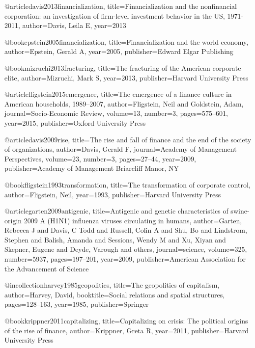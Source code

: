 @article{davis2013financialization,
  title={Financialization and the nonfinancial corporation: an investigation of firm-level investment behavior in the US, 1971-2011},
  author={Davis, Leila E},
  year={2013}
}

@book{epstein2005financialization,
  title={Financialization and the world economy},
  author={Epstein, Gerald A},
  year={2005},
  publisher={Edward Elgar Publishing}
}

@book{mizruchi2013fracturing,
  title={The fracturing of the American corporate elite},
  author={Mizruchi, Mark S},
  year={2013},
  publisher={Harvard University Press}
}

@article{fligstein2015emergence,
  title={The emergence of a finance culture in American households, 1989--2007},
  author={Fligstein, Neil and Goldstein, Adam},
  journal={Socio-Economic Review},
  volume={13},
  number={3},
  pages={575--601},
  year={2015},
  publisher={Oxford University Press}
}

@article{davis2009rise,
  title={The rise and fall of finance and the end of the society of organizations},
  author={Davis, Gerald F},
  journal={Academy of Management Perspectives},
  volume={23},
  number={3},
  pages={27--44},
  year={2009},
  publisher={Academy of Management Briarcliff Manor, NY}
}

@book{fligstein1993transformation,
  title={The transformation of corporate control},
  author={Fligstein, Neil},
  year={1993},
  publisher={Harvard University Press}
}

@article{garten2009antigenic,
  title={Antigenic and genetic characteristics of swine-origin 2009 A (H1N1) influenza viruses circulating in humans},
  author={Garten, Rebecca J and Davis, C Todd and Russell, Colin A and Shu, Bo and Lindstrom, Stephen and Balish, Amanda and Sessions, Wendy M and Xu, Xiyan and Skepner, Eugene and Deyde, Varough and others},
  journal={science},
  volume={325},
  number={5937},
  pages={197--201},
  year={2009},
  publisher={American Association for the Advancement of Science}
}

@incollection{harvey1985geopolitics,
  title={The geopolitics of capitalism},
  author={Harvey, David},
  booktitle={Social relations and spatial structures},
  pages={128--163},
  year={1985},
  publisher={Springer}
}

@book{krippner2011capitalizing,
  title={Capitalizing on crisis: The political origins of the rise of finance},
  author={Krippner, Greta R},
  year={2011},
  publisher={Harvard University Press}
}

